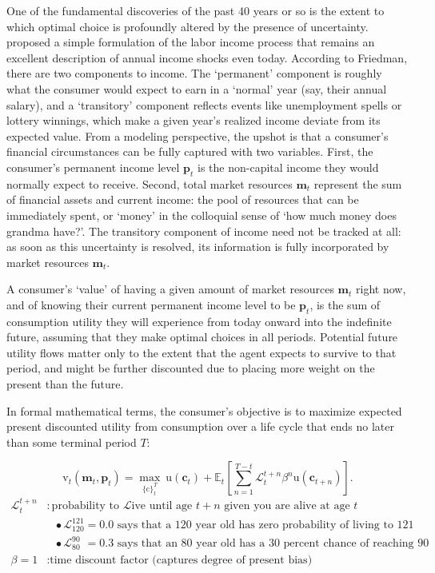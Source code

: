 \documentclass{article}
\newcommand{\uFunc}{\mathrm{u}}
\newcommand{\cLvl}{\mathbf{c}}
\newcommand{\mLvl}{\mathbf{m}}
\newcommand{\pLvl}{\mathbf{p}}
\newcommand{\DiscFac}{\beta}
\newcommand{\cFunc}{\mathrm{c}}
\newcommand{\vFunc}{\mathrm{v}}
\newcommand{\Alive}{\mathcal{L}}
\newcommand{\Ex}{\mathbb{E}}
\begin{document}
One of the fundamental discoveries of the past 40 years or so is the extent to which optimal choice is profoundly altered by the presence of uncertainty.
\cite{friedman1957} proposed a simple formulation of the labor income process that remains an excellent description of annual income shocks even today.  According to Friedman, there are two components to income.
The `permanent' component is roughly what the consumer would expect to earn in a `normal' year (say, their annual salary), and a `transitory' component reflects events like unemployment spells or lottery winnings, which make a given year's realized income deviate from its expected value.
From a modeling perspective, the upshot is that a consumer's financial circumstances can be fully captured with two variables.
First, the consumer's permanent income level $\pLvl_{t}$ is the non-capital income they would normally expect to receive.
Second, total market resources $\mLvl_{t}$ represent the sum of financial assets and current income: the pool of resources that can be immediately spent, or `money' in the colloquial sense of `how much money does grandma have?'.
The transitory component of income need not be tracked at all: as soon as this uncertainty is resolved, its information is fully incorporated by market resources $\mLvl_{t}$.

A consumer's `value' of having a given amount of market resources $\mLvl_{t}$ right now, and of knowing their current permanent income level to be $\pLvl_{t}$, is the sum of consumption utility they will experience from today onward into the indefinite future, assuming that they make optimal choices in all periods.
Potential future utility flows matter only to the extent that the agent expects to survive to that period, and might be further discounted due to placing more weight on the present than the future.

In formal mathematical terms, the consumer's objective is to maximize expected present discounted utility from consumption over a life cycle that ends no later than some terminal period $T$:

\begin{equation}
\label{eq:lifecyclemax}
\pmb{\vFunc}_{t}(\mLvl_{t},\pLvl_{t}) = \max_{\{\cFunc\}_{t}^{T}} ~ \uFunc(\cLvl_{t})+\Ex_{t}\left[\sum_{n=1}^{T-t} \Alive_{t}^{t+n}{\DiscFac}^{n} \uFunc(\cLvl_{t+n}) \right].
\end{equation}
\begin{align*}
    \Alive _{t}^{t+n} & : \text{probability to } \Alive \text{ive until age $t+n$ given you are alive at age $t$}
    \\                   & {~~~}\bullet \Alive_{120}^{121} = 0.0 \text{ says that a 120 year old has zero probability of living to 121}
    \\                   & {~~~}\bullet \Alive_{80\phantom{1}}^{90\phantom{1}} = 0.3 \text{ says that an 80 year old has a 30 percent chance of reaching 90}
    \\ \DiscFac = 1        & : \text{time discount factor (captures degree of present bias)}
\end{align*}
\end{document}
